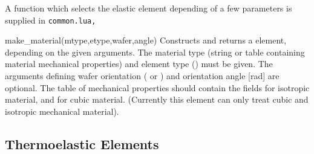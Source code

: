 A function which selects the elastic element depending of a 
few parameters is supplied in \tt{common.lua},
\begin{codelist}
  \item[make\_material(mtype,etype,wafer,angle)]
    Constructs and returns a  element, depending on the
    given arguments. The material type  (string or table containing
    material mechanical properties) and element type
    () must be given. 
    The arguments defining wafer orientation ( or
    ) and orientation angle  [rad] are optional.
    The table of mechanical properties  should contain the 
    fields  for isotropic material, and  for cubic material.
    (Currently this element can only treat cubic and isotropic mechanical
     material).
\end{codelist}

\clearpage
\subsection{Thermoelastic Elements}

